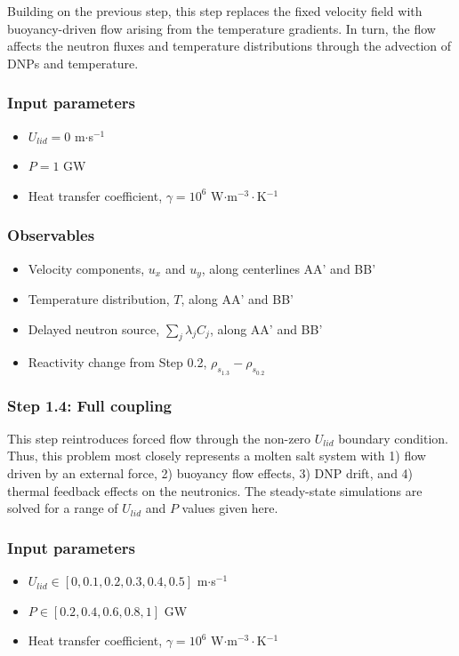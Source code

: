 Building on the previous step, this step replaces the fixed velocity field with
buoyancy-driven flow arising from the temperature gradients. In turn, the flow
affects the neutron fluxes and temperature distributions through the advection
of \glspl{DNP} and temperature.

\subsubsection*{Input parameters}
\begin{itemize}
    \item $U_{lid} = 0$ m$\cdot$s$^{-1}$
    \item $P = 1$ GW
    \item Heat transfer coefficient, $\gamma = 10^6$ W$\cdot$m$^{-3}\cdot$K$^{-1}$
\end{itemize}
%
\subsubsection*{Observables}
\begin{itemize}
    \item Velocity components, $u_x$ and $u_y$, along centerlines AA' and BB'
    \item Temperature distribution, $T$, along AA' and BB'
    \item Delayed neutron source, $\sum_j \lambda_j C_j$, along AA' and BB'
    \item Reactivity change from Step 0.2, $\rho_{s_{1.3}} - \rho_{s_{0.2}}$
\end{itemize}

\subsubsection{Step 1.4: Full coupling}

This step reintroduces forced flow through the non-zero $U_{lid}$ boundary
condition. Thus, this problem most closely represents a molten salt system with
1) flow driven by an external force, 2) buoyancy flow effects, 3) \gls{DNP}
drift, and 4) thermal feedback effects on the neutronics. The steady-state
simulations are solved for a range of $U_{lid}$ and $P$ values given here.

\subsubsection*{Input parameters}
\begin{itemize}
    \item $U_{lid} \in [0, 0.1, 0.2, 0.3, 0.4, 0.5]$ m$\cdot$s$^{-1}$
    \item $P \in [0.2, 0.4, 0.6, 0.8, 1]$ GW
    \item Heat transfer coefficient, $\gamma = 10^6$ W$\cdot$m$^{-3}\cdot$K$^{-1}$
\end{itemize}
%

